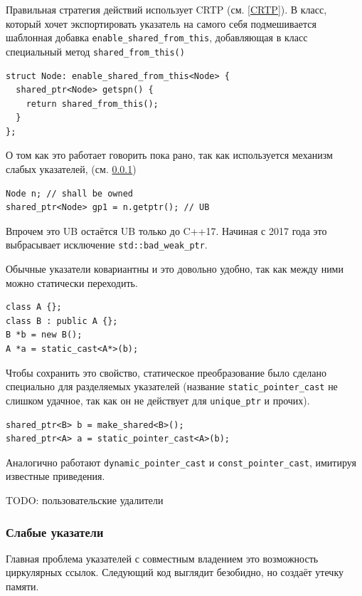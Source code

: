 \documentclass[a4paper,12pt,oneside]{article}
\begin{document}
Правильная стратегия действий использует CRTP (см. \ref{CRTP}). В класс, который хочет экспортировать указатель на самого себя подмешивается шаблонная добавка \lstinline!enable_shared_from_this!, добавляющая в класс специальный метод \lstinline!shared_from_this()!

\begin{lstlisting}
struct Node: enable_shared_from_this<Node> {
  shared_ptr<Node> getspn() {
    return shared_from_this();
  }
};
\end{lstlisting}

О том как это работает говорить пока рано, так как используется механизм слабых указателей, (см. \ref{subsub:weakptrs})

\begin{lstlisting}
Node n; // shall be owned
shared_ptr<Node> gp1 = n.getptr(); // UB
\end{lstlisting}

Впрочем это UB остаётся UB только до C++17. Начиная с 2017 года это выбрасывает исключение \lstinline!std::bad_weak_ptr!.

Обычные указатели ковариантны и это довольно удобно, так как между ними можно статически переходить.

\begin{lstlisting}
class A {};
class B : public A {};
B *b = new B();
A *a = static_cast<A*>(b);
\end{lstlisting}

Чтобы сохранить это свойство, статическое преобразование было сделано специально для разделяемых указателей (название \lstinline!static_pointer_cast! не слишком удачное, так как он не действует для \lstinline!unique_ptr! и прочих).

\begin{lstlisting}
shared_ptr<B> b = make_shared<B>();
shared_ptr<A> a = static_pointer_cast<A>(b);
\end{lstlisting}

Аналогично работают \lstinline!dynamic_pointer_cast! и \lstinline!const_pointer_cast!, имитируя известные приведения.

TODO: пользовательские удалители

\subsubsection{Слабые указатели}\label{subsub:weakptrs}

Главная проблема указателей с совместным владением это возможность циркулярных ссылок. Следующий код выглядит безобидно, но создаёт утечку памяти.
\end{document}
